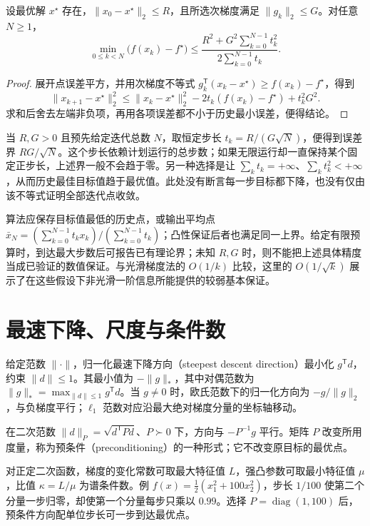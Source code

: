 \begin{proposition}[有界次梯度下的最佳历史值界]
设最优解 $x^\star$ 存在，$\|x_0-x^\star\|_2\leq R$，且所选次梯度满足 $\|g_k\|_2\leq G$。对任意 $N\geq1$，
\[
 \min_{0\leq k<N}\bigl(f(x_k)-f^\star\bigr)
 \leq\frac{R^2+G^2\sum_{k=0}^{N-1}t_k^2}
              {2\sum_{k=0}^{N-1}t_k}.
\]
\end{proposition}
\begin{proof}
展开点误差平方，并用次梯度不等式
$g_k^{\mathsf T}(x_k-x^\star)\geq f(x_k)-f^\star$，得到
\[
 \|x_{k+1}-x^\star\|_2^2
 \leq\|x_k-x^\star\|_2^2
 -2t_k(f(x_k)-f^\star)+t_k^2G^2.
\]
求和后舍去左端非负项，再用各项误差都不小于历史最小误差，便得结论。
\end{proof}

当 $R,G>0$ 且预先给定迭代总数 $N$，取恒定步长 $t_k=R/(G\sqrt N)$，便得到误差界 $RG/\sqrt N$。这个步长依赖计划运行的总步数；如果无限运行却一直保持某个固定正步长，上述界一般不会趋于零。另一种选择是让 $\sum_k t_k=+\infty$、$\sum_k t_k^2<+\infty$，从而历史最佳目标值趋于最优值。此处没有断言每一步目标都下降，也没有仅由该不等式证明全部迭代点收敛。

算法应保存目标值最低的历史点，或输出平均点 $\bar x_N=(\sum_{k=0}^{N-1}t_kx_k)/(\sum_{k=0}^{N-1}t_k)$；凸性保证后者也满足同一上界。给定有限预算时，到达最大步数后可报告已有理论界；未知 $R,G$ 时，则不能把上述具体精度当成已验证的数值保证。与光滑梯度法的 $O(1/k)$ 比较，这里的 $O(1/\sqrt{k})$ 展示了在这些假设下非光滑一阶信息所能提供的较弱基本保证。

\section{最速下降、尺度与条件数}

给定范数 $\|\cdot\|$，归一化最速下降方向（steepest descent direction）最小化 $g^{\mathsf T}d$，约束 $\|d\|\leq1$。其最小值为 $-\|g\|_*$，其中对偶范数为 $\|g\|_*=\max_{\|d\|\leq1}g^{\mathsf T}d$。当 $g\ne0$ 时，欧氏范数下的归一化方向为 $-g/\|g\|_2$，与负梯度平行；$\ell_1$ 范数对应沿最大绝对梯度分量的坐标轴移动。

在二次范数 $\|d\|_P=\sqrt{d^{\mathsf T}Pd}$、$P\succ0$ 下，方向与 $-P^{-1}g$ 平行。矩阵 $P$ 改变所用度量，称为预条件（preconditioning）的一种形式；它不改变原目标的最优点。

对正定二次函数，梯度的变化常数可取最大特征值 $L$，强凸参数可取最小特征值 $\mu$，比值 $\kappa=L/\mu$ 为谱条件数。例 $f(x)=\tfrac12(x_1^2+100x_2^2)$，步长 $1/100$ 使第二个分量一步归零，却使第一个分量每步只乘以 $0.99$。选择 $P=\operatorname{diag}(1,100)$ 后，预条件方向配单位步长可一步到达最优点。

